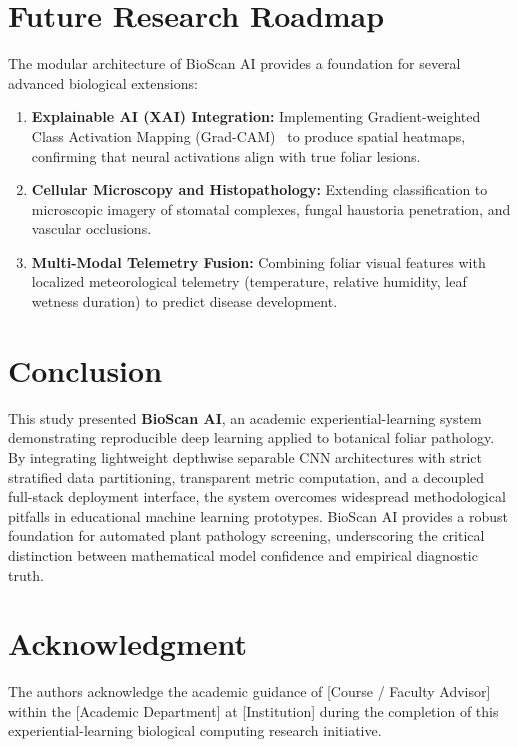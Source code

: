 \documentclass[11pt,a4paper]{article}
\begin{document}
\section{Future Research Roadmap}

The modular architecture of BioScan AI provides a foundation for several advanced biological extensions:
\begin{enumerate}
    \item \textbf{Explainable AI (XAI) Integration:} Implementing Gradient-weighted Class Activation Mapping (Grad-CAM)~\cite{selvaraju2017grad} to produce spatial heatmaps, confirming that neural activations align with true foliar lesions.
    \item \textbf{Cellular Microscopy and Histopathology:} Extending classification to microscopic imagery of stomatal complexes, fungal haustoria penetration, and vascular occlusions.
    \item \textbf{Multi-Modal Telemetry Fusion:} Combining foliar visual features with localized meteorological telemetry (temperature, relative humidity, leaf wetness duration) to predict disease development.
\end{enumerate}

\section{Conclusion}
This study presented \textbf{BioScan AI}, an academic experiential-learning system demonstrating reproducible deep learning applied to botanical foliar pathology. By integrating lightweight depthwise separable CNN architectures with strict stratified data partitioning, transparent metric computation, and a decoupled full-stack deployment interface, the system overcomes widespread methodological pitfalls in educational machine learning prototypes. BioScan AI provides a robust foundation for automated plant pathology screening, underscoring the critical distinction between mathematical model confidence and empirical diagnostic truth.

\section*{Acknowledgment}
The authors acknowledge the academic guidance of [Course / Faculty Advisor] within the [Academic Department] at [Institution] during the completion of this experiential-learning biological computing research initiative.
\end{document}
